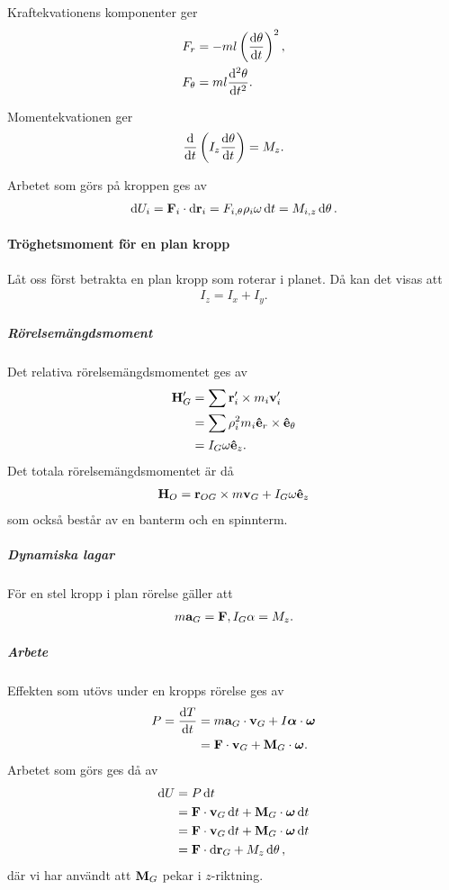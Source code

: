 Kraftekvationens komponenter ger
\begin{align*}
	F_{r}      &= -ml\left(\dv{\theta}{t}\right)^2, \\
	F_{\theta} &= ml\dv[2]{\theta}{t}.
\end{align*}

Momentekvationen ger
\begin{align*}
	\dv{t}\left(I_{z}\dv{\theta}{t}\right) = M_{z}.
\end{align*}

Arbetet som görs på kroppen ges av
\begin{align*}
	\dd{U_{i}} = \vb{F}_{i}\cdot\dd{\vb{r}_{i}} = F_{i, \theta}\rho_{i}\omega\dd{t} = M_{i, z}\dd{\theta}.
\end{align*}

\paragraph{Tröghetsmoment för en plan kropp}
Låt oss först betrakta en plan kropp som roterar i planet. Då kan det visas att
\begin{align*}
	I_{z} = I_{x} + I_{y}.
\end{align*}

\subparagraph{Rörelsemängdsmoment}
Det relativa rörelsemängdsmomentet ges av
\begin{align*}
	\vb{H}_{G}' &= \sum \vb{r}_{i}'\times m_{i}\vb{v}_{i}' \\
	            &= \sum \rho_{i}^{2} m_{i}\vu{e}_{r}\times\vu{e}_{\theta} \\
	            &= I_{G}\omega\vu{e}_{z}.
\end{align*}
Det totala rörelsemängdsmomentet är då
\begin{align*}
	\vb{H}_{O} = \vb{r}_{OG}\times m\vb{v}_{G} + I_{G}\omega\vu{e}_{z}
\end{align*}
som också består av en banterm och en spinnterm.

\subparagraph{Dynamiska lagar}
För en stel kropp i plan rörelse gäller att
\begin{align*}
	m\vb{a}_{G} = \vb{F}, I_{G}\alpha = M_{z}.
\end{align*}

\subparagraph{Arbete}
Effekten som utövs under en kropps rörelse ges av
\begin{align*}
	P = \dv{T}{t} &= m\vb{a}_{G}\cdot\vb{v}_{G} + I\vb*{\alpha}\cdot\vb*{\omega} \\
	              &= \vb{F}\cdot\vb{v}_{G} + \vb{M}_{G}\cdot\vb*{\omega}.
\end{align*}
Arbetet som görs ges då av
\begin{align*}
	\dd{U} &= P\dd{t} \\
	       &= \vb{F}\cdot\vb{v}_{G}\dd{t} + \vb{M}_{G}\cdot\vb*{\omega}\dd{t} \\
	       &= \vb{F}\cdot\vb{v}_{G}\dd{t} + \vb{M}_{G}\cdot\vb*{\omega}\dd{t} \\
	       &= \vb{F}\cdot\dd{\vb{r}_{G}} + M_{z}\dd{\theta},
\end{align*}
där vi har användt att $\vb{M}_{G}$ pekar i $z$-riktning.
